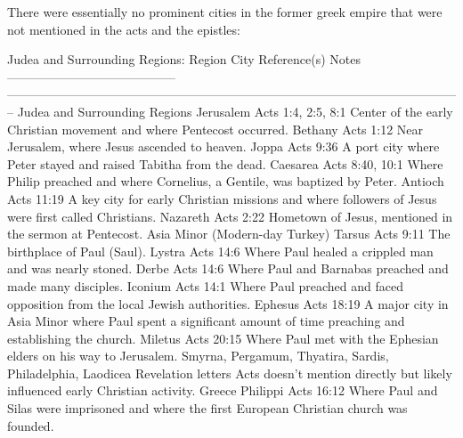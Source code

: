 There were essentially no prominent cities in the former greek empire that were not mentioned in the acts and the epistles:

Judea and Surrounding Regions: \textbar{} Region \textbar{} City \textbar{} Reference(s) \textbar{} Notes \textbar{} \textbar---------------------------\textbar--------------\textbar---------------------------------------\textbar-----------------------------------------------------------------------\textbar{} \textbar{} Judea and Surrounding Regions \textbar{} Jerusalem \textbar{} Acts 1:4, 2:5, 8:1 \textbar{} Center of the early Christian movement and where Pentecost occurred.
\textbar{} \textbar{} \textbar{} Bethany \textbar{} Acts 1:12 \textbar{} Near Jerusalem, where Jesus ascended to heaven.
\textbar{} \textbar{} \textbar{} Joppa \textbar{} Acts 9:36 \textbar{} A port city where Peter stayed and raised Tabitha from the dead.
\textbar{} \textbar{} \textbar{} Caesarea \textbar{} Acts 8:40, 10:1 \textbar{} Where Philip preached and where Cornelius, a Gentile, was baptized by Peter.
\textbar{} \textbar{} \textbar{} Antioch \textbar{} Acts 11:19 \textbar{} A key city for early Christian missions and where followers of Jesus were first called Christians.
\textbar{} \textbar{} \textbar{} Nazareth \textbar{} Acts 2:22 \textbar{} Hometown of Jesus, mentioned in the sermon at Pentecost.
\textbar{} \textbar{} Asia Minor (Modern-day Turkey) \textbar{} Tarsus \textbar{} Acts 9:11 \textbar{} The birthplace of Paul (Saul).
\textbar{} \textbar{} \textbar{} Lystra \textbar{} Acts 14:6 \textbar{} Where Paul healed a crippled man and was nearly stoned.
\textbar{} \textbar{} \textbar{} Derbe \textbar{} Acts 14:6 \textbar{} Where Paul and Barnabas preached and made many disciples.
\textbar{} \textbar{} \textbar{} Iconium \textbar{} Acts 14:1 \textbar{} Where Paul preached and faced opposition from the local Jewish authorities.
\textbar{} \textbar{} \textbar{} Ephesus \textbar{} Acts 18:19 \textbar{} A major city in Asia Minor where Paul spent a significant amount of time preaching and establishing the church.
\textbar{} \textbar{} \textbar{} Miletus \textbar{} Acts 20:15 \textbar{} Where Paul met with the Ephesian elders on his way to Jerusalem.
\textbar{} \textbar{} \textbar{} Smyrna, Pergamum, Thyatira, Sardis, Philadelphia, Laodicea \textbar{} Revelation letters \textbar{} Acts doesn't mention directly but likely influenced early Christian activity.
\textbar{} \textbar{} Greece \textbar{} Philippi \textbar{} Acts 16:12 \textbar{} Where Paul and Silas were imprisoned and where the first European Christian church was founded.
